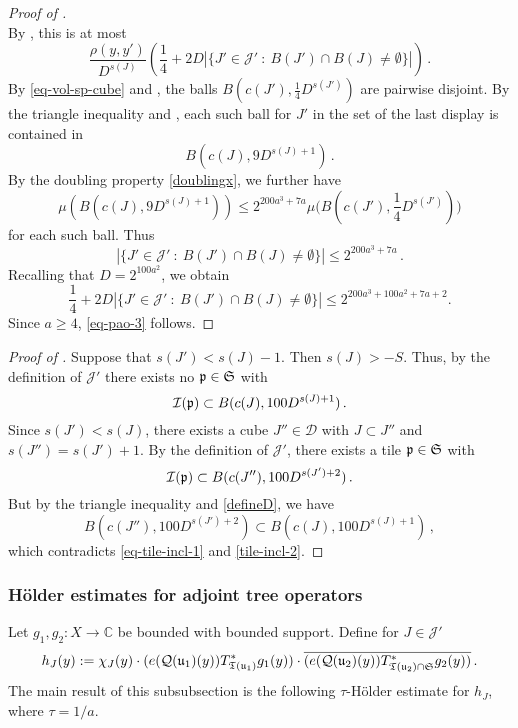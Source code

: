 \begin{proof}[Proof of ]
$$        $$
        By , this is at most
        $$
             \frac{\rho(y,y')}{D^{s(J)}} \left( \frac{1}{4} + 2D |\{J' \in \mathcal{J}' \ : \ B(J') \cap B(J) \ne \emptyset\}|\right)\,.
        $$
        By \eqref{eq-vol-sp-cube} and , the balls $B(c(J'), \frac{1}{4} D^{s(J')})$ are pairwise disjoint. By the triangle inequality and , each such ball for $J'$ in the set of the last display is contained in
        $$
            B(c(J), 9 D^{s(J) + 1})\,.
        $$
        By the doubling property \eqref{doublingx}, we further have
        $$
            \mu(B(c(J), 9 D^{s(J) + 1})) \le 2^{200a^3 + 7a} \mu\Big(B(c(J'), \frac{1}{4}D^{s(J')})\Big)
        $$
        for each such ball.
        Thus
        $$
            |\{J' \in \mathcal{J}' \ : \ B(J') \cap B(J) \ne \emptyset\}| \le 2^{200a^3 + 7a}\,.
        $$
        Recalling that $D=2^{100a^2}$, we obtain
        $$\frac{1}{4} + 2D |\{J' \in \mathcal{J}' \ : \ B(J') \cap B(J) \ne \emptyset\}|\leq 2^{200a^3 + 100a^2 + 7a + 2}.$$
        Since $a\ge 4$, \eqref{eq-pao-3} follows.
    \end{proof}

    \begin{proof}[Proof of ]
        \leanok
        Suppose that $s(J') < s(J) - 1$. Then $s(J) > -S$. Thus, by the definition of $\mathcal{J}'$ there exists no ${\mathfrak p} \in \mathfrak{S}$ with
      \begin{equation}
            \label{eq-tile-incl-1}
            {\mathcal{I}}({\mathfrak p}) \subset B(c(J), 100D^{s(J) + 1})\,.
        \end{equation}
        Since $s(J') < s(J)$, there exists a cube $J'' \in \mathcal{D}$ with $J \subset J''$ and $s(J'') = s(J') + 1$. By the definition of $\mathcal{J}'$, there exists a tile ${\mathfrak p} \in \mathfrak{S}$ with
      \begin{equation}
            \label{tile-incl-2}
            {\mathcal{I}}({\mathfrak p}) \subset B(c(J''), 100 D^{s(J')+2})\,.
        \end{equation}
        But by the triangle inequality and \eqref{defineD}, we have
        $$
            B(c(J''), 100 D^{s(J')+2}) \subset B(c(J), 100D^{s(J) + 1})\,,
        $$
        which contradicts \eqref{eq-tile-incl-1} and \eqref{tile-incl-2}.
    \end{proof}


\subsubsection{H\"older estimates for adjoint tree operators}
\label{subsubsec-holder-estimates}
    Let $g_1, g_2:X \to \mathbb{C}$ be bounded with bounded support.
    Define for $J \in \mathcal{J}'$
    \begin{equation}
        \label{def-hj}
        h_J(y) := \chi_J(y)\cdot(e({\mathcal{Q}}({\mathfrak u}_1)(y)) T_{{\mathfrak T}({\mathfrak u}_1)}^* g_1(y)) \cdot \overline{(e({\mathcal{Q}}({\mathfrak u}_2)(y)) T_{{\mathfrak T}({\mathfrak u}_2) \cap \mathfrak{S}}^* g_2(y))}\,.
    \end{equation}
    The main result of this subsubsection is the following $\tau$-H\"older estimate for $h_J$, where $\tau = 1/a$.

